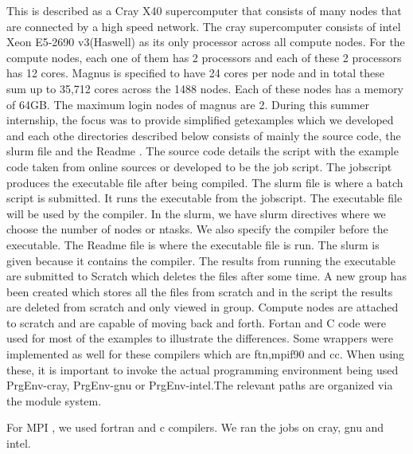 \begin{Document}
{This is described as a Cray X40 supercomputer that consists of many nodes that are connected by a high speed network. The cray supercomputer consists of intel Xeon E5-2690 v3(Haswell) as its only processor across all compute nodes. For the compute nodes, each one of them has 2 processors and each of these 2 processors has 12 cores.
Magnus is specified to have 24 cores per node and in total these sum up to 35,712 cores across the 1488 nodes. Each of these nodes has a memory of 64GB. The maximum login nodes of magnus are 2.
During this summer internship, the focus was to provide simplified getexamples which we developed and each othe directories described below consists of mainly the source code, the slurm file and the Readme . The source code details the script with the example code taken from online sources or developed to be the job script. The jobscript produces the executable file after being compiled. The slurm file is where a batch script is submitted. It runs the executable from the jobscript. The executable file will be used by the compiler. In the slurm, we have slurm directives where we choose the number of nodes or ntasks. We also specify the compiler before the executable. The Readme file is where the executable file is run. The slurm is given because it contains the compiler. The results from running the executable are submitted to Scratch which deletes the files after some time. A new group has been created which stores all the files from scratch and in the script the results are deleted from scratch and only viewed in group. Compute nodes are attached to scratch and are capable of moving back and forth.
Fortan and C code were used for most of the examples to illustrate the differences. Some wrappers were implemented as well for these compilers which are ftn,mpif90 and cc. When using these, it is important to invoke the actual programming environment being used PrgEnv-cray, PrgEnv-gnu or PrgEnv-intel.The relevant paths are organized via the module system.




For MPI , we used fortran and c compilers. We ran the jobs on cray, gnu and intel.











}
\end{Document}
